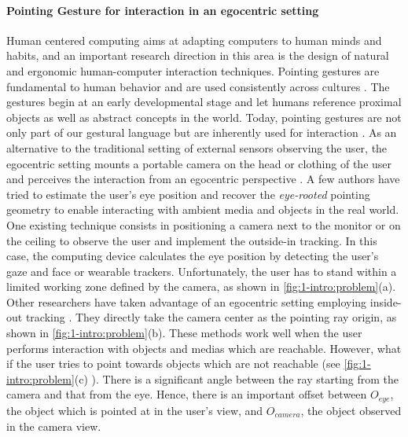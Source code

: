 \paragraph{Pointing Gesture for interaction in an egocentric setting}
Human centered computing aims at adapting computers to human minds and habits, and an important research direction in this area is the design of natural and ergonomic human-computer interaction techniques.
Pointing gestures are fundamental to human behavior \cite{Matthews2012} and are used consistently across cultures  \cite{McNeill2000}. The gestures begin at an early developmental stage \cite{Carpendale2010} and let humans reference proximal objects as well as abstract concepts in the world. Today, pointing gestures are not only part of our gestural language but are inherently used for interaction \cite{Nanayakkara2013a}.
As an alternative to the traditional setting of external sensors observing the user, the egocentric setting mounts a portable camera on the head or clothing of the user and perceives the interaction from an egocentric perspective \cite{Fathi2011,Li2015}. 
A few authors have tried to estimate the user's eye position and recover the \textit{eye-rooted} pointing geometry to enable interacting with ambient media and objects in the real world. One existing technique consists in positioning a camera next to the monitor or on the ceiling to observe the user and implement the outside-in tracking. In this case, the computing device calculates the eye position by detecting the user's gaze and face or wearable trackers. Unfortunately, the user has to stand within a limited working zone defined by the camera, as shown in \figurename{ \ref{fig:1-intro:problem}(a)}.
Other researchers have taken advantage of an egocentric setting employing inside-out tracking \cite{Harrison2011,Mistry2009}. 
They directly take the camera center as the pointing ray origin, as shown in \figurename{ \ref{fig:1-intro:problem}(b)}. These methods work well when the user performs interaction with objects and medias which are reachable.
However, {what if} the user tries to point towards objects which are not reachable (see \figurename{ \ref{fig:1-intro:problem}(c)} ). There is a significant angle between the ray starting from the camera and that from the eye. Hence, there is an important offset between $O_{eye}$, the object which is pointed at in the user's view, and $O_{camera}$, the object observed in the camera view.
